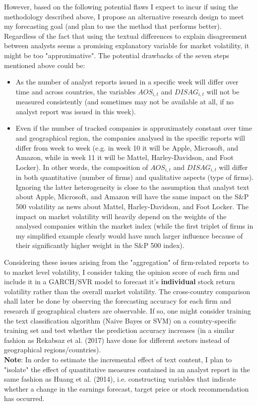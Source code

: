 \documentclass[12pt, a4paper]{article}
\begin{document}
However, based on the following potential flaws I expect to incur if using the methodology described above, I propose an alternative research design to meet my forecasting goal (and plan to use the method that performs better). Regardless of the fact that using the textual differences to explain disagreement between analysts seems a promising explanatory variable for market volatility, it might be too "approximative". The potential drawbacks of the seven steps mentioned above could be:
\begin{itemize}
\item As the number of analyst reports issued in a specific week will differ over time and across countries, the variables $AOS_{i,t}$ and $DISAG_{i,t}$ will not be measured consistently (and sometimes may not be available at all, if no analyst report was issued in this week). 
\item Even if the number of tracked companies is approximately constant over time and geographical region, the companies analysed in the specific reports will differ from week to week (e.g. in week 10 it will be Apple, Microsoft, and Amazon, while in week 11 it will be Mattel, Harley-Davidson, and Foot Locker). In other words, the composition of $AOS_{i,t}$ and $DISAG_{i,t}$ will differ in both quantitative (number of firms) and qualitative aspects (type of firms). Ignoring the latter heterogeneity is close to the assumption that analyst text about Apple, Microsoft, and Amazon will have the same impact on the S\&P 500 volatility as news about Mattel, Harley-Davidson, and Foot Locker. The impact on market volatility will heavily depend on the weights of the analysed companies within the market index (while the first triplet of firms in my simplified example clearly would have much larger influence because of their significantly higher weight in the S\&P 500 index).\\
\end{itemize}
Considering these issues arising from the "aggregation" of firm-related reports to to market level volatility, I consider taking the opinion score of each firm and include it in a GARCH/SVR model to forecast it's \textbf{individual} stock return volatility rather than the overall market volatility. The cross-country comparison shall later be done by observing the forecasting accuracy for each firm and research if geographical clusters are observable. If so, one might consider training the text classification algorithm (Naive Bayes or SVM) on a country-specific training set and test whether the prediction accuracy increases (in a similar fashion as Rekabsaz et al. (2017) have done for different sectors instead of geographical regions/countries). 
\\ \newline
\textbf{Note}: In order to estimate the incremental effect of text content, I plan to "isolate" the effect of quantitative measures contained in an analyst report in the same fashion as Huang et al. (2014), i.e. constructing variables that indicate whether a change in the earnings forecast, target price or stock recommendation has occurred. 
\end{document}
